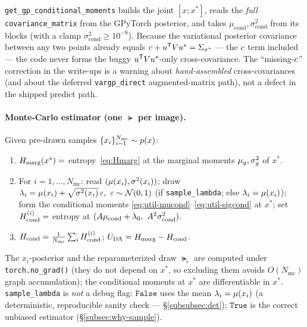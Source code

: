 \begin{remark}\label{rem:cond-correct}
\texttt{get\_gp\_conditional\_moments} builds the joint $[x;x^{*}]$, reads the
\emph{full} \texttt{covariance\_matrix} from the GPyTorch posterior, and takes
$\mu_{\mathrm{cond}},\sigma^{2}_{\mathrm{cond}}$ from its blocks
(with a clamp $\sigma^{2}_{\mathrm{cond}}\ge10^{-8}$). Because the variational
posterior covariance between any two points already equals
$c+u^{\mathsf{T}}Vu^{*}=\Sigma_{x^{*}}$ --- the $c$ term
included --- the code never forms the buggy $u^{\mathsf{T}}Vu^{*}$-only
cross-covariance. The ``missing-$c$'' correction in the write-ups is a
warning about \emph{hand-assembled} cross-covariances (and about the deferred
\texttt{vargp\_direct} augmented-matrix path), not a defect in the shipped
predict path.
\end{remark}

\paragraph{Monte-Carlo estimator (one $\lat$ per image).}
Given pre-drawn samples $\{x_i\}_{i=1}^{N_{\mathrm{mc}}}\sim p(x)$:
%
\begin{enumerate}\itemsep2pt
  \item $H_{\mathrm{marg}}(x^{*})=$ entropy~\eqref{eq:Hmarg} at the marginal moments
        $\mu_{g},\sigma_{g}^{2}$ of $x^{*}$.
  \item For $i=1,\dots,N_{\mathrm{mc}}$: read $(\mu(x_i),\sigma^{2}(x_i))$; draw
        $\lat_i=\pmean(x_i)+\sqrt{\pvar(x_i)}\,\varepsilon,\ \varepsilon\sim\Gauss(0,1)$
        (if \texttt{sample\_lambda}; else $\lambda_i=\mu(x_i)$); form the
        conditional moments \eqref{eq:util-mucond}--\eqref{eq:util-sigcond} at
        $x^{*}$; set $H_{\mathrm{cond}}^{(i)}=$ entropy at $(\gain\mu_{\mathrm{cond}}+\latz,\ \gain^{2}\sigma^{2}_{\mathrm{cond}})$.
  \item $H_{\mathrm{cond}}=\tfrac{1}{N_{\mathrm{mc}}}\sum_iH_{\mathrm{cond}}^{(i)}$;\quad
        $U_{\mathrm{DA}}=H_{\mathrm{marg}}-H_{\mathrm{cond}}$.
\end{enumerate}
%
The $x_i$-posterior and the reparameterized draw $\lat_i$ are computed under
\texttt{torch.no\_grad()} (they do not depend on $x^{*}$, so excluding them avoids
$O(N_{\mathrm{mc}})$ graph accumulation); the conditional moments at $x^{*}$ are
differentiable in $x^{*}$. \texttt{sample\_lambda} is \emph{not} a debug flag:
$\texttt{False}$ uses the mean $\lambda_i=\mu(x_i)$ (a deterministic, reproducible
sanity check --- \S\ref{subsubsec:det}); $\texttt{True}$ is the correct unbiased
estimator (\S\ref{subsec:why-sample}).

